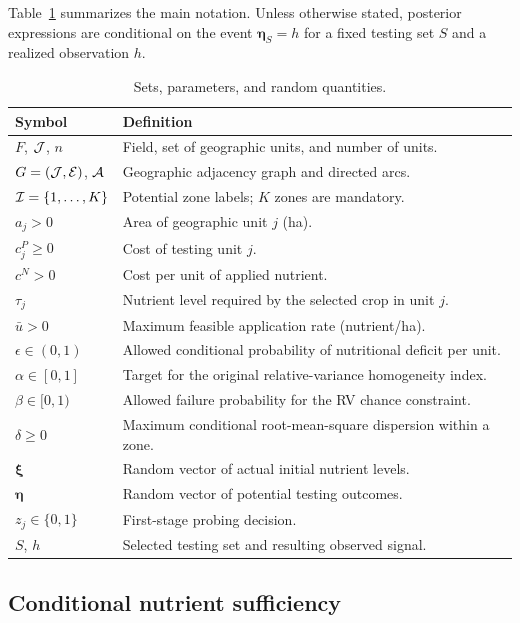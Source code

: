 Table~\ref{tab:notation} summarizes the main notation. Unless otherwise
stated, posterior expressions are conditional on the event
$\boldsymbol{\eta}_{S}=h$ for a fixed testing set $S$ and a realized
observation $h$.

\begin{table}[htbp]
\centering
\caption{Sets, parameters, and random quantities.}
\label{tab:notation}
\small
\renewcommand{\arraystretch}{1.16}
\begin{tabularx}{\linewidth}{@{}lX@{}}
\toprule
Symbol & Definition \\
\midrule
$F$, $\mathcal{J}$, $n$ & Field, set of geographic units, and number of units. \\
$G=(\mathcal{J},\mathcal{E})$, $\mathcal{A}$ & Geographic adjacency graph and directed arcs. \\
$\mathcal{I}=\{1,\ldots,K\}$ & Potential zone labels; $K$ zones are mandatory. \\
$a_j>0$ & Area of geographic unit $j$ (ha). \\
$c_j^P\geq0$ & Cost of testing unit $j$. \\
$c^N>0$ & Cost per unit of applied nutrient. \\
$\tau_j$ & Nutrient level required by the selected crop in unit $j$. \\
$\bar u>0$ & Maximum feasible application rate (nutrient/ha). \\
$\epsilon\in(0,1)$ & Allowed conditional probability of nutritional deficit per unit. \\
$\alpha\in[0,1]$ & Target for the original relative-variance homogeneity index. \\
$\beta\in[0,1)$ & Allowed failure probability for the RV chance constraint. \\
$\delta\geq0$ & Maximum conditional root-mean-square dispersion within a zone. \\
$\boldsymbol{\xi}$ & Random vector of actual initial nutrient levels. \\
$\boldsymbol{\eta}$ & Random vector of potential testing outcomes. \\
$z_j\in\{0,1\}$ & First-stage probing decision. \\
$S$, $h$ & Selected testing set and resulting observed signal. \\
\bottomrule
\end{tabularx}
\end{table}

\subsection{Conditional nutrient sufficiency}
\label{subsec:quantile}

